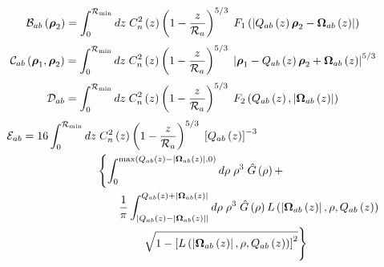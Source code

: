 \begin{equation}\label{caliph_B}
\mathcal{B}_{ab}\left(\boldsymbol{\rho}_{2}\right) = 
\int_{0}^{\mathcal{R}_{\rm min}} dz \; C_{n}^{2}\left(z\right) \left( 1 - \frac{z}{\mathcal{R}_{a}}\right)^{5/3}\; 
F_{1}\left(\left\vert Q_{ab}\left(z\right)\boldsymbol{\rho}_{2} - \boldsymbol{\Omega}_{ab}\left(z\right)\right\vert\right)
\end{equation}
\begin{equation}\label{caliph_C}
\mathcal{C}_{ab}\left(\boldsymbol{\rho}_{1}, \boldsymbol{\rho}_{2}\right) = 
\int_{0}^{\mathcal{R}_{\rm min}} dz \; C_{n}^{2}\left(z\right) \left( 1 - \frac{z}{\mathcal{R}_{a}}\right)^{5/3}\; 
\left\vert\boldsymbol{\rho}_{1} - Q_{ab}\left(z\right)\boldsymbol{\rho}_{2} + \boldsymbol{\Omega}_{ab}\left(z\right)\right\vert^{5/3}
\end{equation}
\begin{equation}\label{caliph_D}
\mathcal{D}_{ab} = 
\int_{0}^{\mathcal{R}_{\rm min}} dz \; C_{n}^{2}\left(z\right) \left( 1 - \frac{z}{\mathcal{R}_{a}}\right)^{5/3}\; 
F_{2}\left(Q_{ab}\left(z\right),\left\vert\boldsymbol{\Omega}_{ab}\left(z\right)\right\vert\right)
\end{equation}
\begin{equation}\label{caliph_E}
\begin{split}
\mathcal{E}_{ab} = 
16 \int_{0}^{\mathcal{R}_{\rm min}} dz & \; C_{n}^{2}\left(z\right) \left( 1 - \frac{z}{\mathcal{R}_{a}}\right)^{5/3}\; 
\left[Q_{ab}\left(z\right)\right]^{-3}
\\ 
& \left\{\int_{0}^{{\rm max}\left(Q_{ab}\left(z\right)-\left\vert \boldsymbol{\Omega}_{ab} \left(z\right)\right\vert,0\right)} d\rho \; \rho^{3} \; \hat{G}\left(\rho\right) + 
\right.
\\ 
& 
\quad\quad
\frac{1}{\pi} \int^{Q_{ab}\left(z\right)+\left\vert \boldsymbol{\Omega}_{ab}\left(z\right)\right\vert}_{\left\vert Q_{ab}\left(z\right)-\left\vert \boldsymbol{\Omega}_{ab}\left(z\right)\right\vert\right\vert}
d\rho \; \rho^{3} \; \hat{G}\left(\rho\right) L\left(\left\vert\boldsymbol{\Omega}_{ab}\left(z\right)\right\vert, \rho, Q_{ab}\left(z\right)\right) \\
& 
\quad\quad\quad\quad
\left.
\sqrt{1 - \left[L\left(\left\vert\boldsymbol{\Omega}_{ab}\left(z\right)\right\vert, \rho, Q_{ab}\left(z\right)\right)\right]^{2}}
\vphantom{\int_{0}^{{\rm max}\left(Q_{ab}\left(z\right)-\left\vert \boldsymbol{\Omega}_{ab} \left(z\right)\right\vert,0\right)}}
\right\} 
\end{split}
\end{equation}
